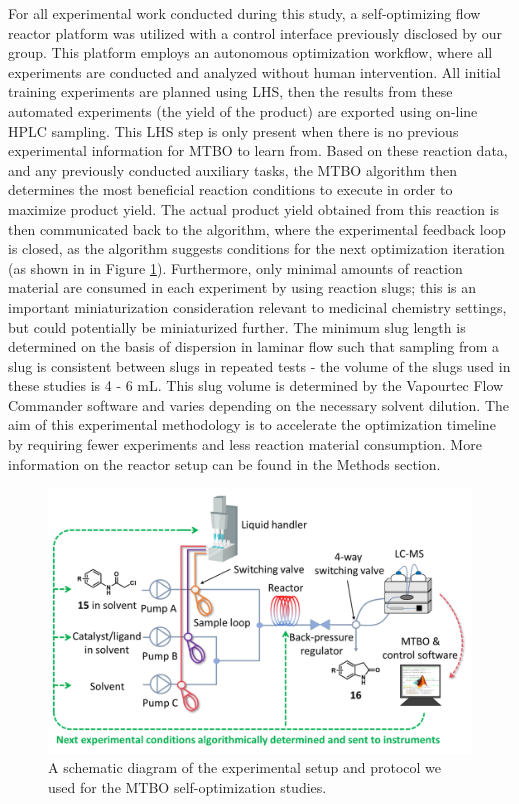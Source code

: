 For all experimental work conducted during this study, a self-optimizing flow reactor platform was utilized with a control interface previously disclosed by our group. This platform employs an autonomous optimization workflow, where all experiments are conducted and analyzed without human intervention. All initial training experiments are planned using LHS, then the results from these automated experiments (the yield of the product) are exported using on-line HPLC sampling. This LHS step is only present when there is no previous experimental information for MTBO to learn from. Based on these reaction data, and any previously conducted auxiliary tasks, the MTBO algorithm then determines the most beneficial reaction conditions to execute in order to maximize product yield. The actual product yield obtained from this reaction is then communicated back to the algorithm, where the experimental feedback loop is closed, as the algorithm suggests conditions for the next optimization iteration (as shown in in Figure \ref{fig:self_opt_setup}). Furthermore, only minimal amounts of reaction material are consumed in each experiment by using reaction slugs; this is an important miniaturization consideration relevant to medicinal chemistry settings, but could potentially be miniaturized further. The minimum slug length is determined on the basis of dispersion in laminar flow such that sampling from a slug is consistent between slugs in repeated tests - the volume of the slugs used in these studies is 4 - 6 mL. This slug volume is determined by the Vapourtec Flow Commander software and varies depending on the necessary solvent dilution. The aim of this experimental methodology is to accelerate the optimization timeline by requiring fewer experiments and less reaction material consumption. More information on the reactor setup can be found in the Methods section.

\begin{figure}
    \centering
    \includegraphics{gfx/Chapter04/self_optimization_setup.png}
    \caption{A schematic diagram of the experimental setup and protocol we used for the MTBO self-optimization studies.}
    \label{fig:self_opt_setup}
\end{figure}

